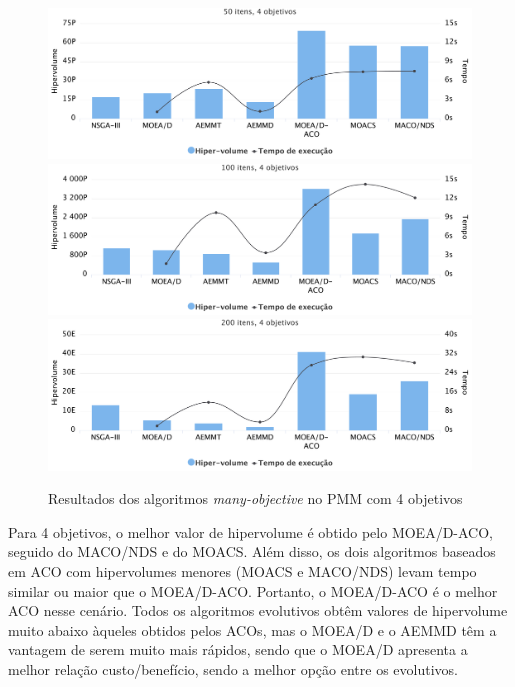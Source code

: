\begin{figure}[!htbp]
	\includegraphics[width=1\textwidth]{cap_experimentos/figs/etapa4/i50o4}
	\includegraphics[width=1\textwidth]{cap_experimentos/figs/etapa4/i100o4}
	\includegraphics[width=1\textwidth]{cap_experimentos/figs/etapa4/i200o4}
	\caption{\label{fig_exp4_mkp_o4}Resultados dos algoritmos \textit{many-objective} no PMM com 4 objetivos}
\end{figure}

Para 4 objetivos, o melhor valor de hipervolume é obtido pelo MOEA/D-ACO, seguido do MACO/NDS e do MOACS. Além disso, os dois algoritmos baseados em ACO com hipervolumes menores (MOACS e MACO/NDS) levam tempo similar ou maior que o MOEA/D-ACO. Portanto, o MOEA/D-ACO é o melhor ACO nesse cenário. Todos os algoritmos evolutivos obtêm valores de hipervolume muito abaixo àqueles obtidos pelos ACOs, mas o MOEA/D e o AEMMD têm a vantagem de serem muito mais rápidos, sendo que o MOEA/D apresenta a melhor relação custo/benefício, sendo a melhor opção entre os evolutivos.


